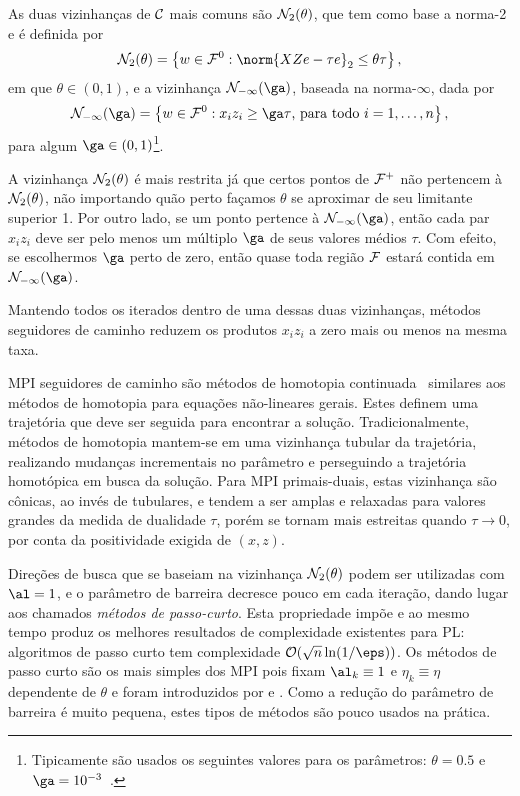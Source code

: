 As duas vizinhanças de $\mathcal{C}$ mais comuns são  $\mathcal{N}_2(\theta)$, que tem como base a norma-2 e é definida por
\[
\Nset_2(\theta) = \left\{w\in\Fset^0 : \norm{XZe - \tau e}_2 \leq \theta\tau  
\right\},
\]
em que $\theta \in (0,1)$, e a vizinhança 
$\Nset_{-\infty}(\ga)$, baseada na norma-$\infty$, dada por 
\begin{equation}
\label{eq:infty-neig}
\Nset_{-\infty}(\ga) = \left\{w\in\Fset^0 : x_iz_i\geq \ga\tau\text{, para
todo }i =1,\dotsc,n \right\},
\end{equation}
para algum $\ga\in(0,1)$\footnote{Tipicamente são usados os seguintes valores 
para os parâmetros: $\theta = 0.5$ e $\ga = 10^{-3}$~\cite[pg.
9]{Wright:Primal-dual-interior-point:1997h}.}.

A vizinhança $\mathcal{N}_2(\theta)$ é mais restrita já que certos pontos de $\mathcal{F}^+$
não pertencem à $\mathcal{N}_2(\theta)$, não importando quão perto façamos $\theta$ se
aproximar de seu limitante superior 1. Por outro lado, se um ponto pertence à
$\Nset_{-\infty}(\ga)$, então cada par $x_iz_i$ deve ser pelo menos um múltiplo
$\ga$ de seus valores médios $\tau$. Com efeito, se escolhermos $\ga$ perto de
zero, então quase toda região $\mathcal{F}$ estará contida em $\Nset_{-\infty}(\ga)$. 

Mantendo todos os iterados dentro de uma dessas duas vizinhanças, métodos
seguidores de caminho reduzem  os produtos $x_iz_i$ a zero mais ou menos na
mesma taxa.


\ac{MPI} seguidores de caminho são  métodos de homotopia
continuada~\cite{Nazareth:1986jg}
similares aos métodos de homotopia para equações não-lineares gerais. Estes
definem uma trajetória que
deve ser seguida para encontrar a solução. Tradicionalmente, métodos de
homotopia mantem-se em uma vizinhança tubular da trajetória, realizando mudanças
incrementais no parâmetro e perseguindo a trajetória homotópica em busca da
solução. Para \ac{MPI} primais-duais, estas vizinhança são cônicas, ao invés de
tubulares, e tendem a ser amplas e relaxadas  para valores grandes da medida de
dualidade $\tau$, porém se tornam mais estreitas quando $\tau\to0$, por conta da
positividade exigida de $(x,z)$.


 Direções de busca que se baseiam na vizinhança $\mathcal{N}_2(\theta)$ podem ser
 utilizadas com $\al=1$, e o parâmetro de barreira decresce pouco em cada
 iteração, dando lugar aos chamados \emph{métodos de passo-curto}. Esta
 propriedade impõe e ao mesmo tempo produz os melhores resultados de
 complexidade existentes para \ac{PL}: algoritmos de passo curto tem
 complexidade $\Oset(\sqrt{n}\ln (1/\eps))$. Os métodos de passo curto
 são os mais simples dos \ac{MPI} pois fixam $\al_k\equiv  1$ e $\eta_k \equiv \eta$
 dependente de $\theta$ e foram introduzidos por
 \textcite{Kojima:1989fw} e \textcite{Monteiro:1989go}. Como a redução do
 parâmetro de barreira é muito pequena, estes tipos de métodos são pouco usados
 na prática.
   
